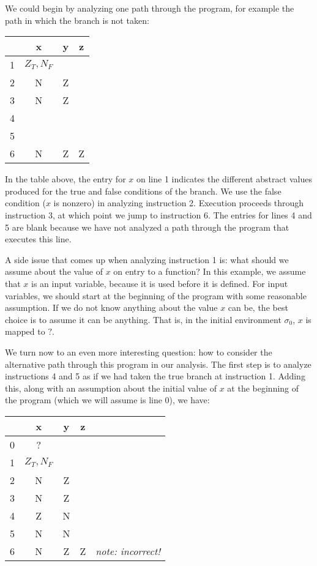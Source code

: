\documentclass[11pt]{article}
\def\tablespace{\vspace{2ex}}
\begin{document}
We could begin by analyzing one path through the program, for example the path in which the branch is not taken:

\tablespace
\begin{tabular}{r | c c c}

  & x & y & z \\
\hline
1 & $Z_T,N_F$ &   &  \\
2 & N & Z &  \\
3 & N & Z &  \\
4 &   &   &  \\
5 &   &   &  \\
6 & N & Z & Z\\

\end{tabular}
\tablespace

In the table above, the entry for $x$ on line 1 indicates the different abstract values produced for the true and false conditions of the branch.  We use the false condition ($x$ is nonzero) in analyzing instruction 2.  Execution proceeds through instruction 3, at which point we jump to instruction 6.  The entries for lines 4 and 5 are blank because we have not analyzed a path through the program that executes this line.

A side issue that comes up when analyzing instruction 1 is: what should we
assume about the value of $x$ on entry to a function?  In this example, we
assume that $x$ is an input variable, because it is used before it is defined.
For input variables, we should start at the beginning of the program with some
reasonable assumption.  If we do not know anything about the value $x$ can be,
the best choice is to assume it can be anything.  That is, in the initial
environment $\sigma_0$, $x$ is mapped to $?$.

We turn now to an even more interesting question: how to consider the
alternative path through this program in our analysis.  The first step is to
analyze instructions 4 and 5 as if we had taken the true branch at instruction
1.  Adding this, along with an assumption about the initial value of $x$ at the
beginning of the program (which we will assume is line 0), we have:

\tablespace
\begin{tabular}{r | c c c l}

  & x & y & z \\
\hline
0 & ? &   &  \\
1 & $Z_T,N_F$ &   &  \\
2 & N & Z &  \\
3 & N & Z &  \\
4 & Z & N &  \\
5 & N & N &  \\
6 & N & Z & Z & \textit{note: incorrect!}\\

\end{tabular}
\tablespace
\end{document}
